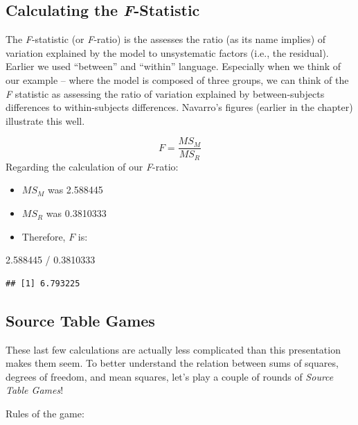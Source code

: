 \documentclass[
  english,
]{book}
\newenvironment{Shaded}{\begin{snugshade}}{\end{snugshade}}
\newcommand{\FloatTok}[1]{\textcolor[rgb]{0.00,0.00,0.81}{#1}}
\newcommand{\SpecialCharTok}[1]{\textcolor[rgb]{0.00,0.00,0.00}{#1}}
\providecommand{\tightlist}{%
  \setlength{\itemsep}{0pt}\setlength{\parskip}{0pt}}
\begin{document}
\hypertarget{calculating-the-f-statistic}{%
\subsection{\texorpdfstring{Calculating the \emph{F}-Statistic}{Calculating the F-Statistic}}\label{calculating-the-f-statistic}}

The \emph{F}-statistic (or \emph{F}-ratio) is the assesses the ratio (as its name implies) of variation explained by the model to unsystematic factors (i.e., the residual). Earlier we used ``between'' and ``within'' language. Especially when we think of our example -- where the model is composed of three groups, we can think of the \emph{F} statistic as assessing the ratio of variation explained by between-subjects differences to within-subjects differences. Navarro's \citep{navarro_chapter_2020} figures (earlier in the chapter) illustrate this well.

\[F = \frac{MS_{M}}{MS_{R}}\]
Regarding the calculation of our \emph{F}-ratio:

\begin{itemize}
\tightlist
\item
  \(MS_M\) was 2.588445
\item
  \(MS_R\) was 0.3810333
\item
  Therefore, \(F\) is:
\end{itemize}

\begin{Shaded}
\begin{Highlighting}[]
\FloatTok{2.588445} \SpecialCharTok{/} \FloatTok{0.3810333}
\end{Highlighting}
\end{Shaded}

\begin{verbatim}
## [1] 6.793225
\end{verbatim}

\hypertarget{source-table-games}{%
\subsection{Source Table Games}\label{source-table-games}}

These last few calculations are actually less complicated than this presentation makes them seem. To better understand the relation between sums of squares, degrees of freedom, and mean squares, let's play a couple of rounds of \emph{Source Table Games}!

Rules of the game:
\end{document}
